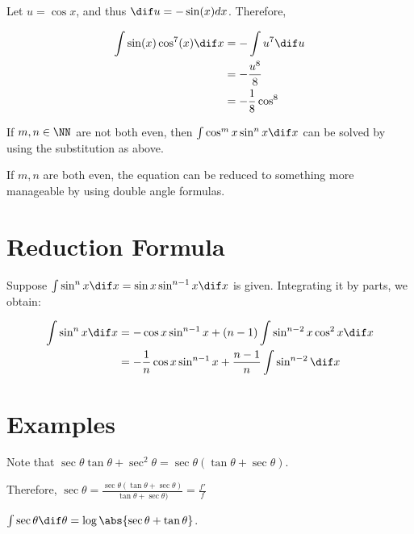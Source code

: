 \documentclass[11pt]{scrartcl}
\begin{document}
\begin{example}

  Let $u=\cos x$, and thus $\dif u = -\sin(x) dx$. Therefore,

  \begin{align}
    \int \sin(x)\cos^7(x) \dif x & = -\int u^7 \dif u \\
                                 & = -\frac{u^8}{8}   \\
                                 & = -\frac{1}{8}\cos^8
  \end{align}
\end{example}

\begin{example}

  If $m, n\in\NN$ are not both even, then
  $\int \cos^m x\sin^nx \dif x$ can be solved by using the substitution as above.

  If $m, n$ are both even, the equation can be reduced to something
  more manageable by using double angle formulas.
\end{example}

\section{Reduction Formula}

Suppose $\int \sin ^n x \dif x = \sin x \sin^{n-1}x \dif x$ is
given. Integrating it by parts, we obtain:

\begin{align}
  \int \sin^nx \dif x &= -\cos x \sin^{n-1} x + (n-1)\int \sin^{n-2}x\cos^2x \dif x\\
                      &= -\frac{1}{n}\cos x \sin^{n-1}x+\frac{n-1}{n}\int \sin^{n-2}\dif x
\end{align}

\section{Examples}

\begin{example}

  Note that $\sec \theta \tan \theta + \sec^2\theta = \sec \theta(\tan\theta + \sec\theta)$.

  Therefore, $\sec \theta = \frac{\sec \theta(\tan\theta + \sec\theta)}{\tan\theta + \sec\theta)} = \frac{f'}{f}$

  $\int \sec\theta \dif \theta = \log \abs{\sec \theta +\tan \theta}$.
\end{example}
\end{document}
